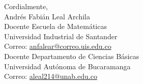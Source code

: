 \documentclass[12pt, fleqn, leqno]{book}
\theoremstyle{plain}
\theoremstyle{definition}
\begin{document}
\begin{flushright}
Cordialmente,\\
Andrés Fabián Leal Archila\\
Docente Escuela de Matemáticas\\
Universidad Industrial de Santander\\
Correo: \url{anfalear@correo.uis.edu.co}\\
Docente Departamento de Ciencias Básicas\\
Universidad Autónoma de Bucaramanga\\
Correo: \url{aleal214@unab.edu.co}
\end{flushright}


\newpage
\tableofcontents
\newpage
\listoftheorems [numwidth=3.5em]
\newpage
\listoffigures 











\nocite{*} %


\end{document}
